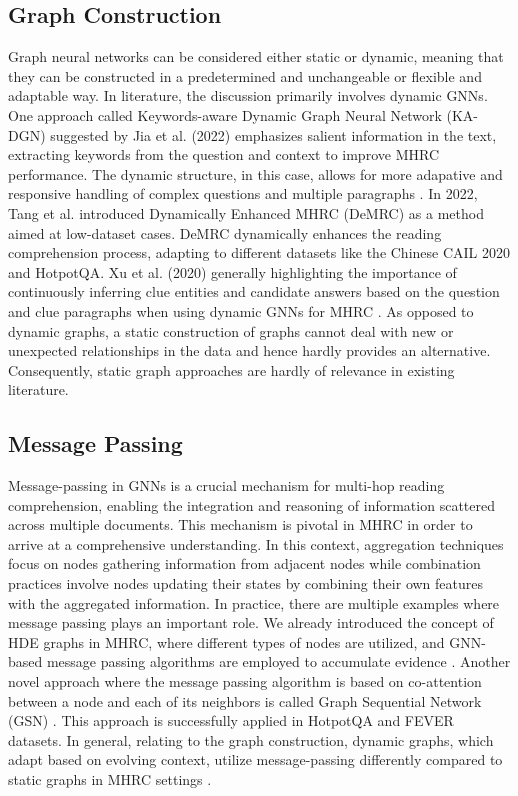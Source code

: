 \documentclass[sigplan,screen]{acmart}
\begin{document}
\subsection{Graph Construction}
Graph neural networks can be considered either static or dynamic, meaning that they can be constructed in a predetermined and unchangeable or flexible 
and adaptable way. In literature, the discussion primarily involves dynamic GNNs. One approach called Keywords-aware Dynamic Graph Neural Network (KA-DGN)
suggested by Jia et al. (2022) \cite{RN171b} emphasizes salient information in the text, extracting keywords from the question and context to improve MHRC performance.
The dynamic structure, in this case, allows for more adapative and responsive handling of complex questions and multiple paragraphs \cite{RN171b}. In 2022, 
Tang et al. \cite{RN172} introduced Dynamically Enhanced MHRC (DeMRC) as a method aimed at low-dataset cases. DeMRC dynamically enhances the reading comprehension process,
adapting to different datasets like the Chinese CAIL 2020 and HotpotQA. Xu et al. (2020) generally highlighting the importance of continuously inferring
clue entities and candidate answers based on the question and clue paragraphs when using dynamic GNNs for MHRC \cite{RN173}. 
As opposed to dynamic graphs, a static construction of graphs cannot deal with new or unexpected relationships in the data and hence hardly
provides an alternative. Consequently, static graph approaches are hardly of relevance in existing literature. 

\subsection{Message Passing}
Message-passing in GNNs is a crucial mechanism for multi-hop reading comprehension, enabling the integration and reasoning of information scattered across multiple documents. 
This mechanism is pivotal in MHRC in order to arrive at a comprehensive understanding. In this context, aggregation techniques focus on nodes gathering information
from adjacent nodes while combination practices involve nodes updating their states by combining their own features with the aggregated information. In practice,
there are multiple examples where message passing plays an important role. We already introduced the concept of HDE graphs in MHRC, where different types of 
nodes are utilized, and GNN-based message passing algorithms are employed to accumulate evidence \cite{RN124}. Another novel approach where the message
passing algorithm is based on co-attention between a node and each of its neighbors is called Graph Sequential Network (GSN) \cite{RN210}. This approach is 
successfully applied in HotpotQA and FEVER datasets. In general, relating to the graph construction, dynamic graphs, which adapt based on evolving context, 
utilize message-passing differently compared to static graphs in MHRC settings \cite{RN171b}. 
\end{document}
